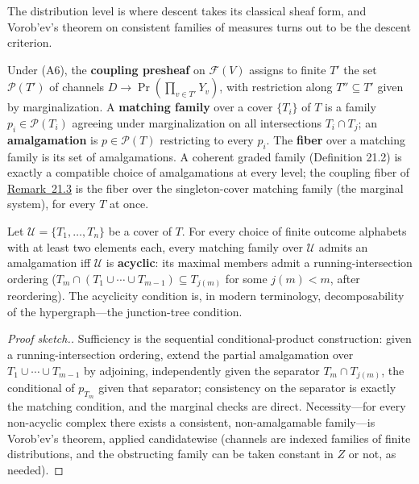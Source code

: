
The distribution level is where descent takes its classical sheaf form, and Vorob'ev's theorem on consistent families of measures turns out to be the descent criterion.

\begin{thmdef}

Under (A6), the \textbf{coupling presheaf} on \(\mathcal{F}(V)\) assigns to finite \(T'\) the set \(\mathcal{P}(T')\) of channels \(D \to \Pr(\prod_{v \in T'} Y_v)\), with restriction along \(T'' \subseteq T'\) given by marginalization. A \textbf{matching family} over a cover \(\{T_i\}\) of \(T\) is a family \(p_i \in \mathcal{P}(T_i)\) agreeing under marginalization on all intersections \(T_i \cap T_j\); an \textbf{amalgamation} is \(p \in \mathcal{P}(T)\) restricting to every \(p_i\). The \textbf{fiber} over a matching family is its set of amalgamations. A coherent graded family (Definition 21.2) is exactly a compatible choice of amalgamations at every level; the coupling fiber of \hyperlink{stmt:21.3}{Remark~21.3} is the fiber over the singleton-cover matching family (the marginal system), for every \(T\) at once.
\end{thmdef}

\begin{thmplain}

Let \(\mathcal{U} = \{T_1, \dots, T_n\}\) be a cover of \(T\). For every choice of finite outcome alphabets with at least two elements each, every matching family over \(\mathcal U\) admits an amalgamation iff \(\mathcal{U}\) is \textbf{acyclic}: its maximal members admit a running-intersection ordering (\(T_{m} \cap (T_1 \cup \cdots \cup T_{m-1}) \subseteq T_{j(m)}\) for some \(j(m) < m\), after reordering). \autocite{vorobev1962} The acyclicity condition is, in modern terminology, decomposability of the hypergraph---\hspace{0pt}the junction-tree condition.
\end{thmplain}

\begin{proof}[Proof sketch.]

Sufficiency is the sequential conditional-product construction: given a running-intersection ordering, extend the partial amalgamation over \(T_1 \cup \cdots \cup T_{m-1}\) by adjoining, independently given the separator \(T_m \cap T_{j(m)}\), the conditional of \(p_{T_m}\) given that separator; consistency on the separator is exactly the matching condition, and the marginal checks are direct. Necessity---\hspace{0pt}for every non-acyclic complex there exists a consistent, non-amalgamable family---\hspace{0pt}is Vorob'ev's theorem, applied candidatewise (channels are indexed families of finite distributions, and the obstructing family can be taken constant in \(Z\) or not, as needed).
\end{proof}

